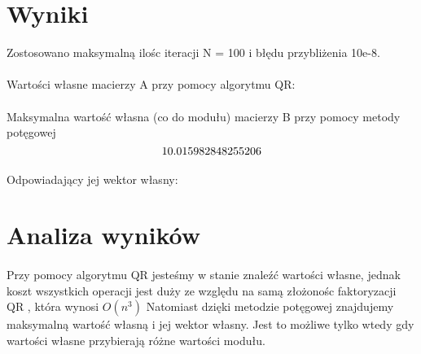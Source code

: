 \documentclass{article}
\begin{document}
\section{Wyniki}

Zostosowano maksymalną ilośc iteracji N = 100 i błędu przybliżenia 10e-8.
\paragraph{}
Wartości własne macierzy A przy pomocy algorytmu QR:\\
\begin{equation*}
[7.23099229  \ 5.90015728 \ 4.81580659 \  1.05304383]
\end{equation*}

\paragraph{}
Maksymalna wartość własna (co do modułu) macierzy B przy pomocy metody potęgowej\\
\begin{equation*}
10.015982848255206\\
\end{equation*}
\paragraph{}
Odpowiadający jej wektor własny:\\
\begin{equation*}
[0.55829692 \ 0.77620834 \  0.28678783  \ 0.05964813]
\end{equation*}



\section{Analiza wyników}
\paragraph{}
Przy pomocy algorytmu QR jesteśmy w stanie znaleźć wartości własne, jednak koszt wszystkich operacji jest duży ze względu na samą złożonośc faktoryzacji QR , która wynosi $O(n^3)$
Natomiast dzięki metodzie potęgowej znajdujemy maksymalną wartość własną i jej wektor własny. Jest to możliwe tylko wtedy gdy wartości własne przybierają różne wartości modułu.
\end{document}
